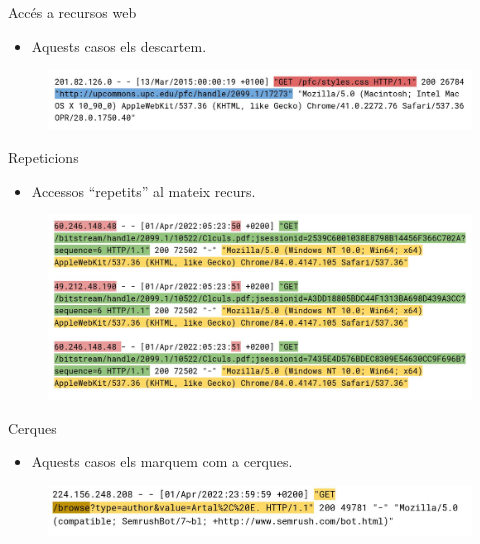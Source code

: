 \begin{frame}{Accés a recursos web}
    \begin{itemize}%
        \item Aquests casos els descartem.
    \end{itemize}

    \begin{figure}[htbp]
        \centerline{\includegraphics[width=\textwidth]{figures/log-web-resource}}
        \label{fig:log-web-resource}
    \end{figure}
\end{frame}

\begin{frame}{Repeticions}
    \begin{itemize}%
        \item Accessos ``repetits'' al mateix recurs.
    \end{itemize}
    \begin{figure}[htbp]
        \centerline{\includegraphics[width=\textwidth]{figures/log-repetitions}}
        \label{fig:log-repetitions}
    \end{figure}
\end{frame}

\begin{frame}{Cerques}
    \begin{itemize}%
        \item Aquests casos els marquem com a cerques.
    \end{itemize}
    \begin{figure}[htbp]
        \centerline{\includegraphics[width=\textwidth]{figures/log-search}}
        \label{fig:log-search}
    \end{figure}
\end{frame}

